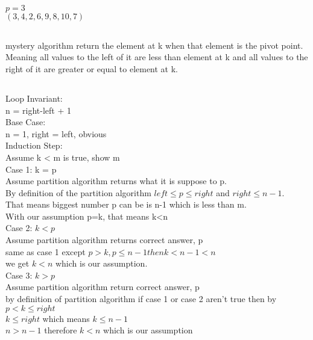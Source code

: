 \documentclass[letterpaper]{article}
\begin{document}
    	\subsection{}
        	$p=3$\\
            $(3, 4, 2, 6, 9, 8, 10, 7)$
		\subsection{}
        	mystery algorithm return the element at k when that element is the pivot point.  Meaning all values to the left of it are less than element at k and all values to the right of it are greater or equal to element at k.\\
		\subsection{}
        	Loop Invariant:\\ n = right-left + 1\\
            Base Case: \\n = 1, right = left, obvious\\
            Induction Step:\\Assume k < m is true, show m\\
            Case 1: k = p \\
            Assume partition algorithm returns what it is suppose to p. \\
            By definition of the partition algorithm $left\leq p\leq right$ and $right \leq n-1$.\\
            That means biggest number p can be is n-1 which is less than m.\\
            With our assumption p=k, that means k<n\\
            Case 2: $k < p$ \\
            Assume partition algorithm returns correct answer, p \\
            same as case 1 except $p>k, p \leq n-1 then k < n-1 < n$\\
            we get $k<n$ which is our assumption. \\
            Case 3: $k > p$ \\
            Assume partition algorithm return correct answer, p\\
            by definition of partition algorithm if case 1 or case 2 aren't true then by $p<k\leq right$\\
            $k \leq right$ which means $k \leq n-1$\\
            $n > n-1$ therefore $k < n$ which is our assumption
\end{document}
